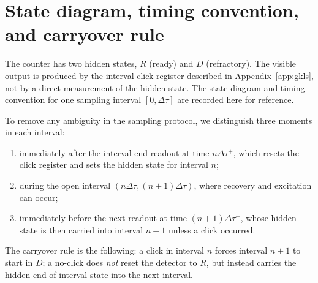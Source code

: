 
\section{State diagram, timing convention, and carryover rule}\label{app:state-diagram}

The counter has two hidden states, $R$ (ready) and $D$ (refractory). The visible output is produced by the interval click register described in Appendix~\ref{app:gkls}, not by a direct measurement of the hidden state. The state diagram and timing convention for one sampling interval $[0,\Delta\tau]$ are recorded here for reference.

To remove any ambiguity in the sampling protocol, we distinguish three moments in each interval:
\begin{enumerate}[label=(\roman*),itemsep=0.15em]
\item immediately after the interval-end readout at time $n\Delta\tau^+$, which resets the click register and sets the hidden state for interval $n$;
\item during the open interval $(n\Delta\tau,(n+1)\Delta\tau)$, where recovery and excitation can occur;
\item immediately before the next readout at time $(n+1)\Delta\tau^-$, whose hidden state is then carried into interval $n+1$ unless a click occurred.
\end{enumerate}
The carryover rule is the following: a click in interval $n$ forces interval $n+1$ to start in $D$; a no-click does \emph{not} reset the detector to $R$, but instead carries the hidden end-of-interval state into the next interval.

\begin{center}
\end{center}

